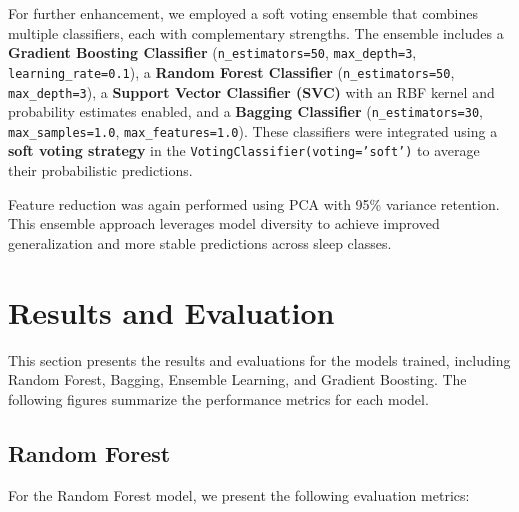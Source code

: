 \begin{sloppypar}
	For further enhancement, we employed a soft voting ensemble that combines multiple classifiers, each with complementary strengths. The ensemble includes a \textbf{Gradient Boosting Classifier} (\texttt{n\_estimators=50}, \texttt{max\_depth=3}, \texttt{learning\_rate=0.1}), a \textbf{Random Forest Classifier} (\texttt{n\_estimators=50}, \texttt{max\_depth=3}), a \textbf{Support Vector Classifier (SVC)} with an RBF kernel and probability estimates enabled, and a \textbf{Bagging Classifier} (\texttt{n\_estimators=30}, \texttt{max\_samples=1.0}, \texttt{max\_features=1.0}). These classifiers were integrated using a \textbf{soft voting strategy} in the \texttt{VotingClassifier(voting='soft')} to average their probabilistic predictions.
	
	Feature reduction was again performed using PCA with 95\% variance retention. This ensemble approach leverages model diversity to achieve improved generalization and more stable predictions across sleep classes.
\end{sloppypar}


\section{Results and Evaluation}

This section presents the results and evaluations for the models trained, including Random Forest, Bagging, Ensemble Learning, and Gradient Boosting. The following figures summarize the performance metrics for each model.


\subsection{Random Forest}

For the Random Forest model, we present the following evaluation metrics:

